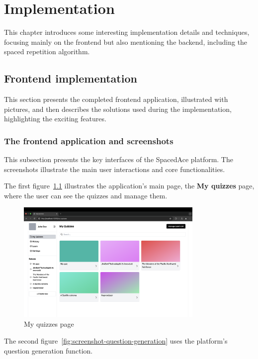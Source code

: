 \chapter{Implementation}

This chapter introduces some interesting implementation details and techniques, focusing mainly on the frontend but also mentioning the backend, including the spaced repetition algorithm.


\section{Frontend implementation}

This section presents the completed frontend application, illustrated with pictures, and then describes the solutions used during the implementation, highlighting the exciting features.

\subsection{The frontend application and screenshots}

This subsection presents the key interfaces of the SpacedAce platform. The screenshots illustrate the main user interactions and core functionalities.

The first figure~\ref{fig:screenshot-quizzes} illustrates the application's main page, the \textbf{My quizzes} page, where the user can see the quizzes and manage them.

\begin{figure}[H]
	\centering
	\includegraphics[width=0.8\textwidth, keepaspectratio]{figures/screenshot-quizzes.png}
	\caption{My quizzes page}
	\label{fig:screenshot-quizzes}
\end{figure}

The second figure~\ref {fig:screenshot-question-generation} uses the platform's question generation function.

